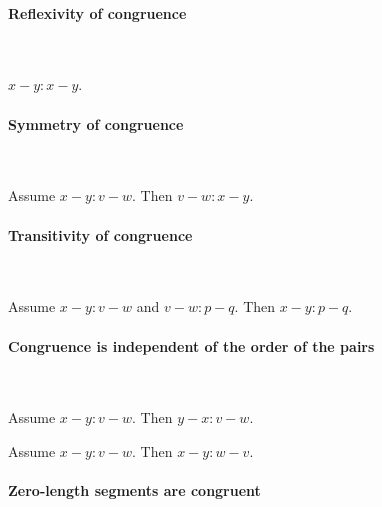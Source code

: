 \documentclass{article}
\begin{document}
  \paragraph{Reflexivity of congruence}\

  \begin{forthel}
    \begin{lemma} %
      $x-y : x-y$.
    \end{lemma}
  \end{forthel}


  \paragraph{Symmetry of congruence}\

  \begin{forthel}
    \begin{lemma} %
      Assume $x-y : v-w$. Then $v-w : x-y$.
    \end{lemma}
  \end{forthel}


  \paragraph{Transitivity of congruence}\

  \begin{forthel}
    \begin{lemma} %
      Assume $x-y : v-w$ and $v-w : p-q$. Then $x-y : p-q$.
    \end{lemma}
  \end{forthel}


  \paragraph{Congruence is independent of the order of the pairs}\

  \begin{forthel}
    \begin{lemma} %
      Assume $x-y : v-w$. Then $y-x : v-w$.
    \end{lemma}

    \begin{lemma} %
      Assume $x-y : v-w$. Then $x-y : w-v$.
    \end{lemma}
  \end{forthel}


  \paragraph{Zero-length segments are congruent}\
\end{document}
